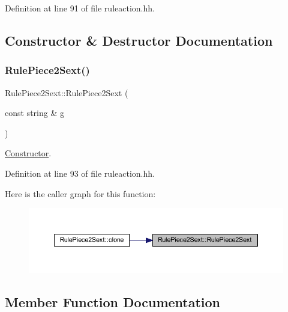 Definition at line 91 of file ruleaction.\+hh.



\subsection{Constructor \& Destructor Documentation}
\mbox{\label{class_rule_piece2_sext_ae5fd1631c104ffecd56818d85f99cd09}} 
\subsubsection{\texorpdfstring{RulePiece2Sext()}{RulePiece2Sext()}}
{\footnotesize\ttfamily Rule\+Piece2\+Sext\+::\+Rule\+Piece2\+Sext (\begin{DoxyParamCaption}\item[{const string \&}]{g }\end{DoxyParamCaption})\hspace{0.3cm}{\ttfamily [inline]}}



\mbox{\hyperlink{class_constructor}{Constructor}}. 



Definition at line 93 of file ruleaction.\+hh.

Here is the caller graph for this function\+:
\nopagebreak
\begin{figure}[H]
\begin{center}
\leavevmode
\includegraphics[width=350pt]{class_rule_piece2_sext_ae5fd1631c104ffecd56818d85f99cd09_icgraph}
\end{center}
\end{figure}


\subsection{Member Function Documentation}
\mbox{\label{class_rule_piece2_sext_a37acf429e9c05f9f03977b136b3bfc22}} 

